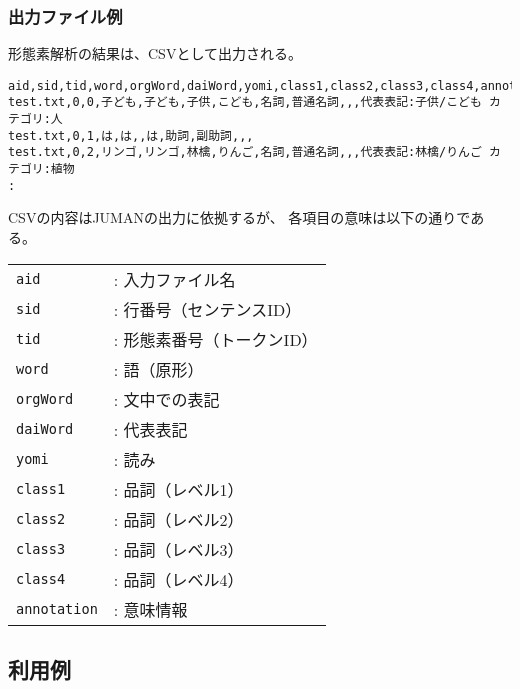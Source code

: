 \subsubsection*{出力ファイル例}

形態素解析の結果は、CSVとして出力される。

\begin{Verbatim}[baselinestretch=0.7,frame=single]
aid,sid,tid,word,orgWord,daiWord,yomi,class1,class2,class3,class4,annotation
test.txt,0,0,子ども,子ども,子供,こども,名詞,普通名詞,,,代表表記:子供/こども カテゴリ:人
test.txt,0,1,は,は,,は,助詞,副助詞,,,
test.txt,0,2,リンゴ,リンゴ,林檎,りんご,名詞,普通名詞,,,代表表記:林檎/りんご カテゴリ:植物
:
\end{Verbatim}

CSVの内容はJUMANの出力に依拠するが、
各項目の意味は以下の通りである。

\begin{table}[htbp]
{\small
\begin{tabular}{ll}
\verb|aid|        & : 入力ファイル名 \\
\verb|sid|        & : 行番号（センテンスID） \\
\verb|tid|        & : 形態素番号（トークンID） \\
\verb|word|       & : 語（原形） \\
\verb|orgWord|    & : 文中での表記 \\
\verb|daiWord|    & : 代表表記 \\
\verb|yomi|       & : 読み \\
\verb|class1|     & : 品詞（レベル1） \\
\verb|class2|     & : 品詞（レベル2） \\
\verb|class3|     & : 品詞（レベル3） \\
\verb|class4|     & : 品詞（レベル4） \\
\verb|annotation| & : 意味情報 \\
\end{tabular} 
}
\end{table} 

\subsection{利用例}


%


